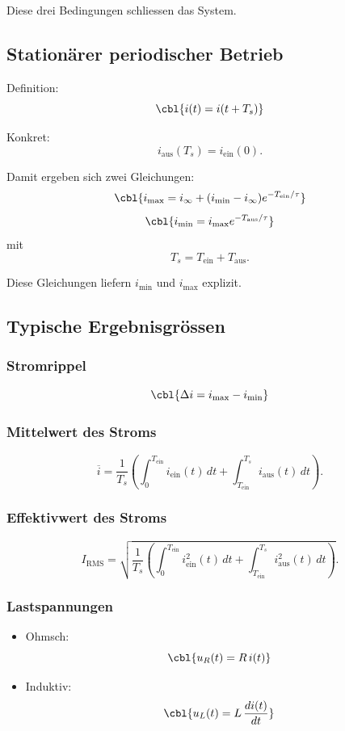 Diese drei Bedingungen schliessen das System.

\subsection{Stationärer periodischer Betrieb}

Definition:
\[
\cbl{i(t)=i(t+T_s)}
\]

Konkret:
\[
i_{\mathrm{aus}}(T_s) = i_{\mathrm{ein}}(0).
\]

Damit ergeben sich zwei Gleichungen:
\[
\cbl{i_{\max} = i_\infty + (i_{\min}-i_\infty)e^{-T_{\mathrm{ein}}/\tau}}
\]
\[
\cbl{i_{\min} = i_{\max} e^{-T_{\mathrm{aus}}/\tau}}
\]
mit
\[
T_s = T_{\mathrm{ein}} + T_{\mathrm{aus}}.
\]

Diese Gleichungen liefern $i_{\min}$ und $i_{\max}$ explizit.

\subsection{Typische Ergebnisgrössen}

\subsubsection{Stromrippel}
\[
\cbl{\Delta i = i_{\max} - i_{\min}}
\]

\subsubsection{Mittelwert des Stroms}
\[
\overline{i} = \frac{1}{T_s} \left(
\int_0^{T_{\mathrm{ein}}} i_{\mathrm{ein}}(t)\,dt
+
\int_{T_{\mathrm{ein}}}^{T_s} i_{\mathrm{aus}}(t)\,dt
\right).
\]

\subsubsection{Effektivwert des Stroms}
\[
I_{\mathrm{RMS}} = \sqrt{
\frac{1}{T_s}
\left(
\int_0^{T_{\mathrm{ein}}} i_{\mathrm{ein}}^2(t)\,dt
+
\int_{T_{\mathrm{ein}}}^{T_s} i_{\mathrm{aus}}^2(t)\,dt
\right)
}.
\]

\subsubsection{Lastspannungen}

\begin{itemize}
    \item Ohmsch:
    \[
    \cbl{u_R(t) = R\,i(t)}
    \]
    \item Induktiv:
    \[
    \cbl{u_L(t) = L\,\frac{di(t)}{dt}}
    \]
\end{itemize}

